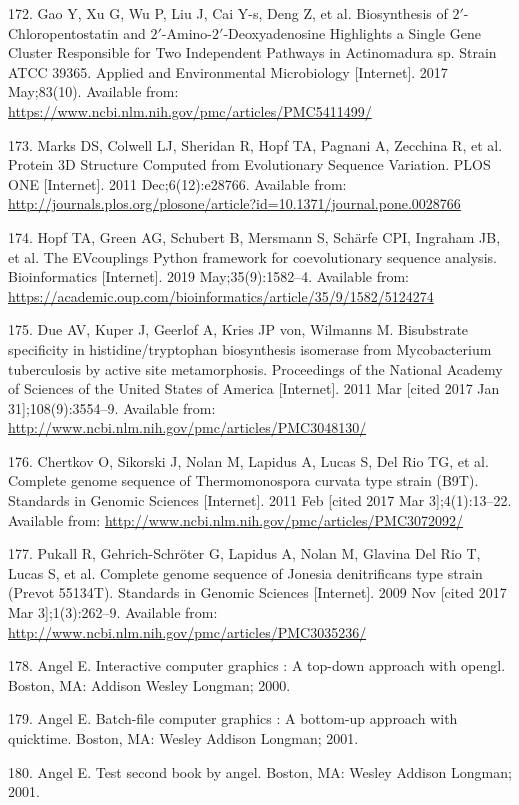 \documentclass[12pt,twoside]{reedthesis}
\begin{document}
  \hypertarget{ref-gao_biosynthesis_2017}{}
  172. Gao Y, Xu G, Wu P, Liu J, Cai Y-s, Deng Z, et al. Biosynthesis of
  \(2\prime\)-Chloropentostatin and
  \(2\prime\)-Amino-\(2\prime\)-Deoxyadenosine Highlights a Single Gene
  Cluster Responsible for Two Independent Pathways in Actinomadura sp.
  Strain ATCC 39365. Applied and Environmental Microbiology
  {[}Internet{]}. 2017 May;83(10). Available from:
  \url{https://www.ncbi.nlm.nih.gov/pmc/articles/PMC5411499/}
  
  \hypertarget{ref-marks_protein_2011}{}
  173. Marks DS, Colwell LJ, Sheridan R, Hopf TA, Pagnani A, Zecchina R,
  et al. Protein 3D Structure Computed from Evolutionary Sequence
  Variation. PLOS ONE {[}Internet{]}. 2011 Dec;6(12):e28766. Available
  from:
  \url{http://journals.plos.org/plosone/article?id=10.1371/journal.pone.0028766}
  
  \hypertarget{ref-hopf_evcouplings_2019}{}
  174. Hopf TA, Green AG, Schubert B, Mersmann S, Schärfe CPI, Ingraham
  JB, et al. The EVcouplings Python framework for coevolutionary sequence
  analysis. Bioinformatics {[}Internet{]}. 2019 May;35(9):1582--4.
  Available from:
  \url{https://academic.oup.com/bioinformatics/article/35/9/1582/5124274}
  
  \hypertarget{ref-due_bisubstrate_2011}{}
  175. Due AV, Kuper J, Geerlof A, Kries JP von, Wilmanns M. Bisubstrate
  specificity in histidine/tryptophan biosynthesis isomerase from
  Mycobacterium tuberculosis by active site metamorphosis. Proceedings of
  the National Academy of Sciences of the United States of America
  {[}Internet{]}. 2011 Mar {[}cited 2017 Jan 31{]};108(9):3554--9.
  Available from:
  \url{http://www.ncbi.nlm.nih.gov/pmc/articles/PMC3048130/}
  
  \hypertarget{ref-chertkov_complete_2011}{}
  176. Chertkov O, Sikorski J, Nolan M, Lapidus A, Lucas S, Del Rio TG, et
  al. Complete genome sequence of Thermomonospora curvata type strain
  (B9T). Standards in Genomic Sciences {[}Internet{]}. 2011 Feb {[}cited
  2017 Mar 3{]};4(1):13--22. Available from:
  \url{http://www.ncbi.nlm.nih.gov/pmc/articles/PMC3072092/}
  
  \hypertarget{ref-pukall_complete_2009}{}
  177. Pukall R, Gehrich-Schröter G, Lapidus A, Nolan M, Glavina Del Rio
  T, Lucas S, et al. Complete genome sequence of Jonesia denitrificans
  type strain (Prevot 55134T). Standards in Genomic Sciences
  {[}Internet{]}. 2009 Nov {[}cited 2017 Mar 3{]};1(3):262--9. Available
  from: \url{http://www.ncbi.nlm.nih.gov/pmc/articles/PMC3035236/}
  
  \hypertarget{ref-angel2000}{}
  178. Angel E. Interactive computer graphics : A top-down approach with
  opengl. Boston, MA: Addison Wesley Longman; 2000.
  
  \hypertarget{ref-angel2001}{}
  179. Angel E. Batch-file computer graphics : A bottom-up approach with
  quicktime. Boston, MA: Wesley Addison Longman; 2001.
  
  \hypertarget{ref-angel2002a}{}
  180. Angel E. Test second book by angel. Boston, MA: Wesley Addison
  Longman; 2001.


\end{document}
